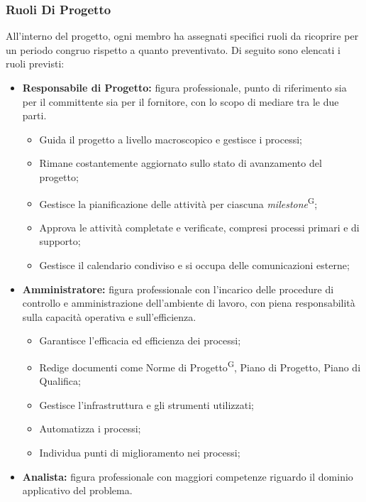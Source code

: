 \documentclass[5pt]{article}
\begin{document}
\subsubsection{Ruoli Di Progetto}
All'interno del progetto, ogni membro ha assegnati specifici ruoli da ricoprire per un periodo congruo rispetto a quanto preventivato. Di seguito sono elencati i ruoli previsti:
\begin{itemize}
    \item \textbf{Responsabile di Progetto:} figura professionale, punto di riferimento sia per il committente sia per il fornitore, con lo scopo di mediare tra le due parti.
        \begin{itemize}
            \item Guida il progetto a livello macroscopico e gestisce i processi;
            \item Rimane costantemente aggiornato sullo stato di avanzamento del progetto;
            \item Gestisce la pianificazione delle attività per ciascuna \textit{milestone}\textsuperscript{G};
            \item Approva le attività completate e verificate, compresi processi primari e di supporto;
            \item Gestisce il calendario condiviso e si occupa delle comunicazioni esterne;
        \end{itemize}
    \item \textbf{Amministratore:} figura professionale con l’incarico delle procedure di controllo e amministrazione dell’ambiente di lavoro, con piena responsabilità sulla capacità operativa e sull’efficienza.
        \begin{itemize}
            \item Garantisce l'efficacia ed efficienza dei processi;
            \item Redige documenti come Norme di Progetto\textsuperscript{G}, Piano di Progetto, Piano di Qualifica;
            \item Gestisce l'infrastruttura e gli strumenti utilizzati;
            \item Automatizza i processi;
            \item Individua punti di miglioramento nei processi;
        \end{itemize}
    \item \textbf{Analista:} figura professionale con maggiori competenze riguardo il dominio applicativo del problema.
        \begin{itemize}

\end{itemize}
\end{itemize}
\end{document}
